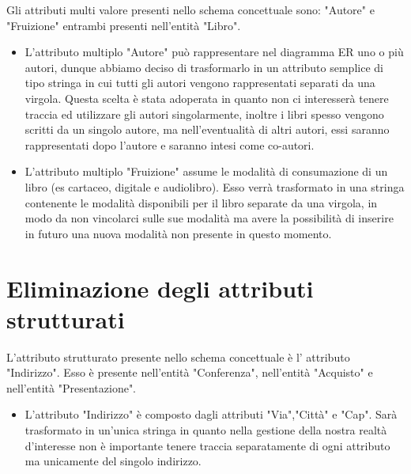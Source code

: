     Gli attributi multi valore presenti nello schema concettuale sono: "Autore" e "Fruizione" entrambi presenti nell'entità "Libro".     
    \begin{itemize}
        \item L'attributo multiplo "Autore" può rappresentare nel diagramma ER uno o più autori, dunque abbiamo deciso di trasformarlo in un attributo semplice di tipo stringa in cui tutti gli autori  vengono rappresentati separati da una virgola. Questa scelta è stata adoperata in quanto non ci interesserà tenere traccia ed utilizzare gli autori singolarmente, inoltre i libri spesso vengono scritti da un singolo autore, ma nell'eventualità di altri autori, essi saranno rappresentati dopo l'autore e saranno intesi come co-autori.
        \item L'attributo multiplo "Fruizione"  assume le modalità di consumazione di un libro (es cartaceo, digitale e audiolibro). Esso verrà trasformato in una stringa contenente le modalità disponibili per il libro separate da una virgola, in modo da non vincolarci sulle sue modalità ma avere la possibilità di inserire in futuro una nuova modalità non presente in questo momento.
    \end{itemize}
    \section{Eliminazione degli attributi strutturati}
     L'attributo strutturato presente nello schema concettuale è l' attributo "Indirizzo". Esso è presente nell'entità "Conferenza", nell'entità "Acquisto" e nell'entità "Presentazione".   

     \begin{itemize}
         \item L'attributo "Indirizzo" è composto dagli attributi "Via","Città" e "Cap". Sarà trasformato in un'unica stringa in quanto nella gestione della nostra realtà d'interesse non è importante tenere traccia separatamente di ogni attributo ma unicamente del singolo indirizzo.
     \end{itemize}
